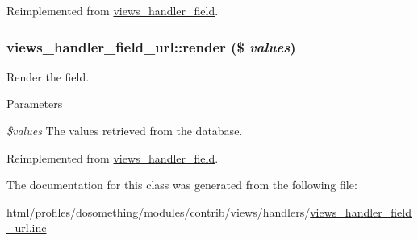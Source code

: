 Reimplemented from \hyperlink{classviews__handler__field_a0435d161922b7b4b84f02a2e79bb947a}{views\_\-handler\_\-field}.\hypertarget{classviews__handler__field__url_a6f96c8adfdd1892619793359448e70ad}{
\subsubsection[{render}]{\setlength{\rightskip}{0pt plus 5cm}views\_\-handler\_\-field\_\-url::render (\$ {\em values})}}
\label{classviews__handler__field__url_a6f96c8adfdd1892619793359448e70ad}
Render the field.


\begin{DoxyParams}{Parameters}
\item[{\em \$values}]The values retrieved from the database. \end{DoxyParams}


Reimplemented from \hyperlink{classviews__handler__field_a82ff951c5e9ceb97b2eab86f880cbc1e}{views\_\-handler\_\-field}.

The documentation for this class was generated from the following file:\begin{DoxyCompactItemize}
\item 
html/profiles/dosomething/modules/contrib/views/handlers/\hyperlink{views__handler__field__url_8inc}{views\_\-handler\_\-field\_\-url.inc}\end{DoxyCompactItemize}
